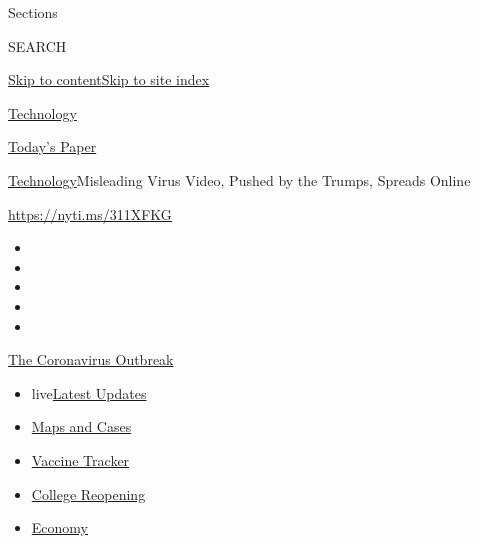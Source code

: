 Sections

SEARCH

\protect\hyperlink{site-content}{Skip to
content}\protect\hyperlink{site-index}{Skip to site index}

\href{https://www.nytimes3xbfgragh.onion/section/technology}{Technology}

\href{https://myaccount.nytimes3xbfgragh.onion/auth/login?response_type=cookie\&client_id=vi}{}

\href{https://www.nytimes3xbfgragh.onion/section/todayspaper}{Today's
Paper}

\href{/section/technology}{Technology}\textbar{}Misleading Virus Video,
Pushed by the Trumps, Spreads Online

\url{https://nyti.ms/311XFKG}

\begin{itemize}
\item
\item
\item
\item
\item
\end{itemize}

\href{https://www.nytimes3xbfgragh.onion/news-event/coronavirus?action=click\&pgtype=Article\&state=default\&region=TOP_BANNER\&context=storylines_menu}{The
Coronavirus Outbreak}

\begin{itemize}
\tightlist
\item
  live\href{https://www.nytimes3xbfgragh.onion/2020/08/04/world/coronavirus-covid-19.html?action=click\&pgtype=Article\&state=default\&region=TOP_BANNER\&context=storylines_menu}{Latest
  Updates}
\item
  \href{https://www.nytimes3xbfgragh.onion/interactive/2020/us/coronavirus-us-cases.html?action=click\&pgtype=Article\&state=default\&region=TOP_BANNER\&context=storylines_menu}{Maps
  and Cases}
\item
  \href{https://www.nytimes3xbfgragh.onion/interactive/2020/science/coronavirus-vaccine-tracker.html?action=click\&pgtype=Article\&state=default\&region=TOP_BANNER\&context=storylines_menu}{Vaccine
  Tracker}
\item
  \href{https://www.nytimes3xbfgragh.onion/2020/08/02/us/covid-college-reopening.html?action=click\&pgtype=Article\&state=default\&region=TOP_BANNER\&context=storylines_menu}{College
  Reopening}
\item
  \href{https://www.nytimes3xbfgragh.onion/live/2020/08/03/business/stock-market-today-coronavirus?action=click\&pgtype=Article\&state=default\&region=TOP_BANNER\&context=storylines_menu}{Economy}
\end{itemize}

